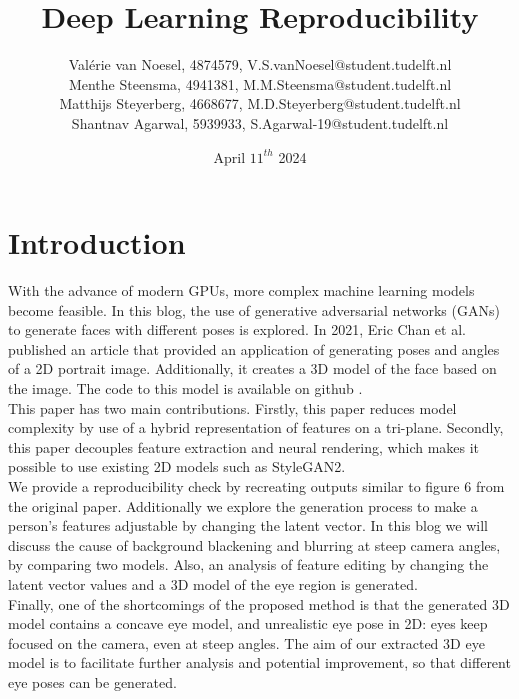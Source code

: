 \documentclass{article}
\title{Deep Learning Reproducibility}
\author{Valérie van Noesel,     4874579,    V.S.vanNoesel@student.tudelft.nl \\ 
Menthe Steensma,     4941381,    M.M.Steensma@student.tudelft.nl\\ 
Matthijs Steyerberg,  4668677,   M.D.Steyerberg@student.tudelft.nl\\ 
Shantnav Agarwal,    5939933,    S.Agarwal-19@student.tudelft.nl }
\date{April $11^{th}$ 2024}
\begin{document}
\maketitle

\section{Introduction}
With the advance of modern GPUs, more complex machine learning models become feasible. In this blog, the use of generative adversarial networks (GANs) to generate faces with different poses is explored. In 2021, Eric Chan et al. \cite{chan2022efficient} published an article that provided an application of generating poses and angles of a 2D portrait image. Additionally, it creates a 3D model of the face based on the image. The code to this model is available on github \parencite{github}.\\
This paper has two main contributions. Firstly, this paper reduces model complexity by use of a hybrid representation of features on a tri-plane. Secondly, this paper decouples feature extraction and neural rendering, which makes it possible to use existing 2D models such as StyleGAN2.\\
We provide a reproducibility check by recreating outputs similar to figure 6 from the original paper. Additionally we explore the generation process to make a person's features adjustable by changing the latent vector. In this blog we will discuss the cause of background blackening and blurring at steep camera angles, by comparing two models. Also, an analysis of feature editing by changing the latent vector values and a 3D model of the eye region is generated. \\
Finally, one of the shortcomings of the proposed method is that the generated 3D model contains a concave eye model, and unrealistic eye pose in 2D: eyes keep focused on the camera, even at steep angles. The aim of our extracted 3D eye model is to facilitate further analysis and potential improvement, so that different eye poses can be generated. 





 
\end{document}
